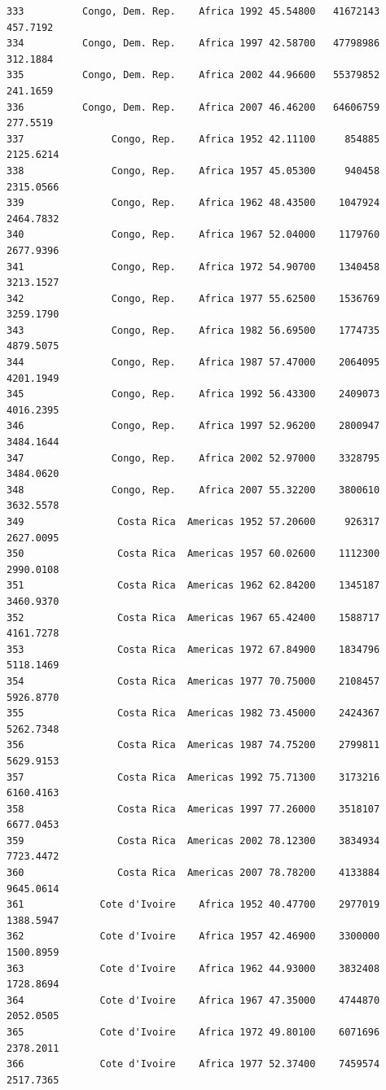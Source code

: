 \documentclass[
  letterpaper,
  DIV=11,
  numbers=noendperiod]{scrreprt}
\begin{document}
\begin{verbatim}
333          Congo, Dem. Rep.    Africa 1992 45.54800   41672143    457.7192
334          Congo, Dem. Rep.    Africa 1997 42.58700   47798986    312.1884
335          Congo, Dem. Rep.    Africa 2002 44.96600   55379852    241.1659
336          Congo, Dem. Rep.    Africa 2007 46.46200   64606759    277.5519
337               Congo, Rep.    Africa 1952 42.11100     854885   2125.6214
338               Congo, Rep.    Africa 1957 45.05300     940458   2315.0566
339               Congo, Rep.    Africa 1962 48.43500    1047924   2464.7832
340               Congo, Rep.    Africa 1967 52.04000    1179760   2677.9396
341               Congo, Rep.    Africa 1972 54.90700    1340458   3213.1527
342               Congo, Rep.    Africa 1977 55.62500    1536769   3259.1790
343               Congo, Rep.    Africa 1982 56.69500    1774735   4879.5075
344               Congo, Rep.    Africa 1987 57.47000    2064095   4201.1949
345               Congo, Rep.    Africa 1992 56.43300    2409073   4016.2395
346               Congo, Rep.    Africa 1997 52.96200    2800947   3484.1644
347               Congo, Rep.    Africa 2002 52.97000    3328795   3484.0620
348               Congo, Rep.    Africa 2007 55.32200    3800610   3632.5578
349                Costa Rica  Americas 1952 57.20600     926317   2627.0095
350                Costa Rica  Americas 1957 60.02600    1112300   2990.0108
351                Costa Rica  Americas 1962 62.84200    1345187   3460.9370
352                Costa Rica  Americas 1967 65.42400    1588717   4161.7278
353                Costa Rica  Americas 1972 67.84900    1834796   5118.1469
354                Costa Rica  Americas 1977 70.75000    2108457   5926.8770
355                Costa Rica  Americas 1982 73.45000    2424367   5262.7348
356                Costa Rica  Americas 1987 74.75200    2799811   5629.9153
357                Costa Rica  Americas 1992 75.71300    3173216   6160.4163
358                Costa Rica  Americas 1997 77.26000    3518107   6677.0453
359                Costa Rica  Americas 2002 78.12300    3834934   7723.4472
360                Costa Rica  Americas 2007 78.78200    4133884   9645.0614
361             Cote d'Ivoire    Africa 1952 40.47700    2977019   1388.5947
362             Cote d'Ivoire    Africa 1957 42.46900    3300000   1500.8959
363             Cote d'Ivoire    Africa 1962 44.93000    3832408   1728.8694
364             Cote d'Ivoire    Africa 1967 47.35000    4744870   2052.0505
365             Cote d'Ivoire    Africa 1972 49.80100    6071696   2378.2011
366             Cote d'Ivoire    Africa 1977 52.37400    7459574   2517.7365

\end{verbatim}
\end{document}
